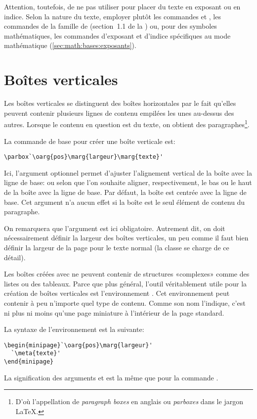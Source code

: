 Attention, toutefois, de ne pas utiliser \cmd{\raisebox} pour placer
du texte en exposant ou en indice. Selon la nature du texte, employer
plutôt les commandes \cmd{\textsuperscript} et \cmd{\textsubscript},
les commandes de la famille \cmd{\ieme} de  (section~1.1 de
la %
) ou, pour des
symboles mathématiques, les commandes d'exposant et d'indice
spécifiques au mode mathématique (\autoref{sec:math:bases:exposants}).

\section{Boîtes verticales}
\label{sec:boites:parbox}

Les boîtes verticales se distinguent des boîtes horizontales par le
fait qu'elles peuvent contenir plusieurs lignes de contenu empilées
les unes au-dessus des autres. Lorsque le contenu en question est du
texte, on obtient des paragraphes\footnote{%
  D'où l'appellation de \emph{paragraph boxes} en anglais
  ou \emph{parboxes} dans le jargon {\LaTeX}.}. %

La commande de base pour créer une boîte verticale est:
\begin{lstlisting}
\parbox`\oarg{pos}\marg{largeur}\marg{texte}'
\end{lstlisting}
Ici, l'argument optionnel  permet d'ajuster l'alignement
vertical de la boîte avec la ligne de base:  ou  selon
que l'on souhaite aligner, respectivement, le bas ou le haut de la
boîte avec la ligne de base. Par défaut, la boîte est centrée avec la
ligne de base. Cet argument n'a aucun effet si la boîte est le seul
élément de contenu du paragraphe.

On remarquera que l'argument  est ici obligatoire.
Autrement dit, on doit nécessairement définir la largeur des boîtes
verticales, un peu comme il faut bien définir la largeur de la page
pour le texte normal (la classe se charge de ce détail).

Les boîtes créées avec \cmd{\parbox} ne peuvent contenir de structures
«complexes» comme des listes ou des tableaux. Parce que plus général,
l'outil véritablement utile pour la création de boîtes verticales est
l'environnement . Cet environnement peut contenir à peu
n'importe quel type de contenu. Comme son nom l'indique, c'est ni plus
ni moins qu'une page miniature à l'intérieur de la page standard.

La syntaxe de l'environnement  est la suivante:
\begin{lstlisting}
\begin{minipage}`\oarg{pos}\marg{largeur}'
  `\meta{texte}'
\end{minipage}
\end{lstlisting}
La signification des arguments  et  est la
même que pour la commande .


